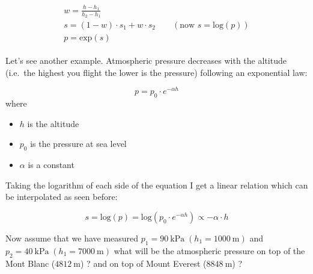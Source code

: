 \begin{align}
\label{eq:log_interp}
\begin{gathered}
w = \frac{h - h_1}{h_2 - h_1} \\
s = (1 - w)\cdot s_1 + w \cdot s_2\qquad (\textrm{now } s = \textrm{log}(p))\\
p = \textrm{exp}(s)
\end{gathered}
\end{align}

Let's see another example. Atmospheric pressure decreases with the altitude (i.e.~the highest you flight the lower is the pressure) following an exponential law:

\begin{equation}
p = p_0\cdot e^{-\alpha h}
\end{equation}
where
\begin{itemize}
\tightlist
\item
  \(h\) is the altitude
\item
  \(p_0\) is the pressure at sea level
\item
  \(\alpha\) is a constant
\end{itemize}

Taking the logarithm of each side of the equation I get a linear relation which can be interpolated as seen before:

\begin{equation}
s = \mathrm{log}(p) = \mathrm{log}(p_0\cdot e^{-\alpha h})\propto - \alpha \cdot h
\end{equation}

Now assume that we have measured
\(p_1 = 90~\mathrm{kPa}\;(h_1 = 1000~\mathrm{m})\) and
\(p_2 = 40~\mathrm{kPa}\;(h_1 = 7000~\mathrm{m})\) what will be the
atmospheric pressure on top of the Mont Blanc (\(4812~\mathrm{m}\)) ? and on top of Mount Everest (\(8848~\mathrm{m}\)) ?

